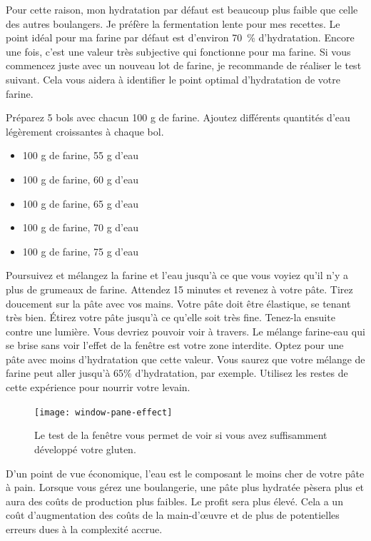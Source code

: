 Pour cette raison, mon hydratation par défaut est beaucoup plus faible que celle des autres boulangers. Je préfère la fermentation lente pour mes recettes.
Le point idéal pour ma farine par défaut est d'environ \qty{70}{\percent} d'hydratation.
Encore une fois, c'est une valeur très subjective qui fonctionne pour ma farine.
Si vous commencez juste avec un nouveau lot de farine,
je recommande de réaliser le test suivant. Cela vous aidera à
identifier le point optimal d'hydratation de votre farine.

Préparez 5 bols avec chacun 100 g de farine. Ajoutez différents
quantités d'eau légèrement croissantes à chaque bol.

\begin{itemize}
  \item 100 g de farine, 55 g d'eau
  \item 100 g de farine, 60 g d'eau
  \item 100 g de farine, 65 g d'eau
  \item 100 g de farine, 70 g d'eau
  \item 100 g de farine, 75 g d'eau
\end{itemize}

Poursuivez et mélangez la farine et l'eau jusqu'à ce que vous voyiez qu'il
n'y a plus de grumeaux de farine. Attendez 15 minutes et revenez à votre pâte.
Tirez doucement sur la pâte avec vos mains. Votre pâte doit être élastique, se
tenant très bien. Étirez votre pâte jusqu'à ce qu'elle soit très fine. Tenez-la ensuite
contre une lumière. Vous devriez pouvoir voir à travers. Le mélange farine-eau qui se brise sans
voir l'effet de la fenêtre est votre zone interdite. Optez pour une pâte avec
moins d'hydratation que cette valeur. Vous saurez que votre mélange de farine peut aller jusqu'à
65\% d'hydratation, par exemple. Utilisez les restes de cette expérience
pour nourrir votre levain.

\begin{figure}[!htb]
  \texttt{[image: window-pane-effect]}
  \caption[Le test de la fenêtre]{Le test de la fenêtre vous permet de voir si vous
      avez suffisamment développé votre gluten.}
\end{figure}

D'un point de vue économique, l'eau est le composant le moins cher de votre pâte
à pain. Lorsque vous gérez une boulangerie, une pâte plus hydratée pèsera plus et aura des
coûts de production plus faibles. Le profit sera plus élevé. Cela a un coût
d'augmentation des coûts de la main-d'œuvre et de plus de potentielles erreurs dues à la complexité
accrue.

